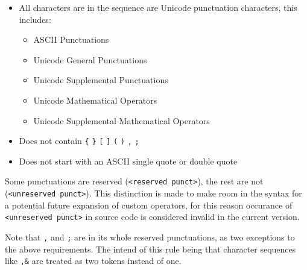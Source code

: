 \documentclass[a4paper]{article}
\begin{document}
\begin{itemize}
    \item All characters are in the sequence are Unicode punctuation characters, this includes:
    \begin{itemize}
        \item ASCII Punctuations
        \item Unicode General Punctuations
        \item Unicode Supplemental Punctuations
        \item Unicode Mathematical Operators
        \item Unicode Supplemental Mathematical Operators
    \end{itemize}
    \item Does not contain \verb|{| \verb|}| \verb|[| \verb|]| \verb|(| \verb|)| \verb|,| \verb|;|
    \item Does not start with an ASCII single quote or double quote
\end{itemize}

Some punctuations are reserved (\verb|<reserved punct>|), the rest are not (\verb|<unreserved punct>|).
This distinction is made to make room in the syntax for a potential future expansion of custom operators, for this reason occurance of \verb|<unreserved punct>| in source code is considered invalid in the current version.

Note that \verb|,| and \verb|;| are in its whole reserved punctuations, as two exceptions to the above requirements. The intend of this rule being that character sequences like \verb|,&| are treated as two tokens instead of one.
\end{document}
